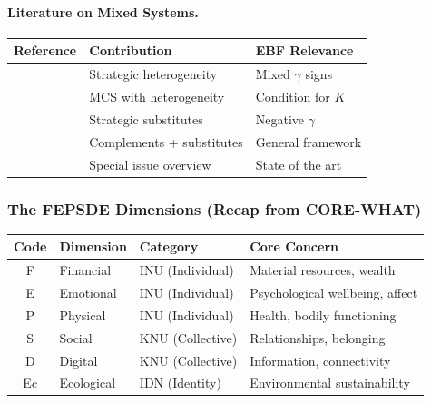 \paragraph{Literature on Mixed Systems.}

\begin{center}
\renewcommand{\arraystretch}{1.3}
\begin{tabular}{|l|l|l|}
\hline
\textbf{Reference} & \textbf{Contribution} & \textbf{EBF Relevance} \\
\hline
\citet{barthel2019rationalizability} & Strategic heterogeneity & Mixed $\gamma$ signs \\
\citet{christensen2019comparative} & MCS with heterogeneity & Condition for $K$ \\
\citet{roy2012characterizing} & Strategic substitutes & Negative $\gamma$ \\
\citet{monaco2016games} & Complements + substitutes & General framework \\
\citet{amir2019supermodularity} & Special issue overview & State of the art \\
\hline
\end{tabular}
\end{center}



\subsubsection{The FEPSDE Dimensions (Recap from CORE-WHAT)}

\begin{center}
\renewcommand{\arraystretch}{1.3}
\begin{tabular}{|c|l|l|l|}
\hline
\textbf{Code} & \textbf{Dimension} & \textbf{Category} & \textbf{Core Concern} \\
\hline
F & Financial & INU (Individual) & Material resources, wealth \\
E & Emotional & INU (Individual) & Psychological wellbeing, affect \\
P & Physical & INU (Individual) & Health, bodily functioning \\
S & Social & KNU (Collective) & Relationships, belonging \\
D & Digital & KNU (Collective) & Information, connectivity \\
Ec & Ecological & IDN (Identity) & Environmental sustainability \\
\hline
\end{tabular}
\end{center}

